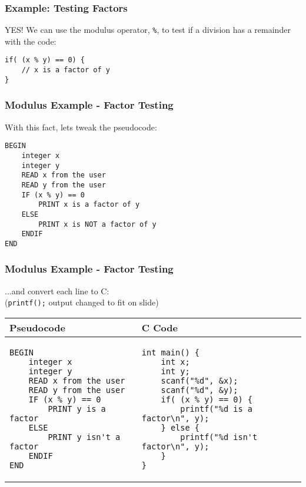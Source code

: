 \documentclass[14pt]{beamer}
\begin{document}
\begin{frame}[fragile]
\frametitle{Example: Testing Factors}
YES! We can use the modulus operator, \texttt{\%}, to test if a division has a remainder with the code:

\begin{lstlisting}[style=CStyle]
if( (x % y) == 0) {
	// x is a factor of y
}
\end{lstlisting}

\end{frame}

\begin{frame}[fragile]
\frametitle{Modulus Example - Factor Testing}
With this fact, lets tweak the pseudocode:
\begin{lstlisting}[style=pseudo]
BEGIN
	integer x
	integer y
	READ x from the user
	READ y from the user
	IF (x % y) == 0
		PRINT x is a factor of y
	ELSE
		PRINT x is NOT a factor of y
	ENDIF
END
\end{lstlisting}
\end{frame}

\begin{frame}[fragile]
\frametitle{Modulus Example - Factor Testing}
...and convert each line to C:\\
\vspace{4mm}
(\texttt{printf();} output changed to fit on slide)
\vspace{-2mm}
\begin{table}[H]
\centering

\begin{tabular}{ll}
Pseudocode & C Code \\
\hline

\begin{lstlisting}[style=pseudo,basicstyle=\ttfamily\scriptsize]
BEGIN
	integer x
	integer y
	READ x from the user
	READ y from the user
	IF (x % y) == 0
		PRINT y is a factor
	ELSE
		PRINT y isn't a factor
	ENDIF
END
\end{lstlisting} &

\begin{lstlisting}[style=Ctable,basicstyle=\ttfamily\scriptsize]
int main() {
	int x;
	int y;
	scanf("%d", &x);
	scanf("%d", &y);
	if( (x % y) == 0) {
		printf("%d is a factor\n", y);
	} else {
		printf("%d isn't factor\n", y);
	}
}
\end{lstlisting}
\\

\hline
\end{tabular}
\end{table}

\end{frame}
\end{document}
